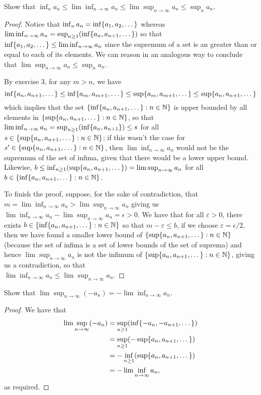 \begin{exercise}{22}
Show that $\inf_na_n\leq \lim\inf_{n\to\infty}a_n\leq \lim\sup_{n\to\infty}a_n\leq \sup_na_n$.
\end{exercise}
\begin{proof}
Notice that $\inf_na_n = \inf\{a_1,a_2,\dots\}$ whereas \\
$\lim\inf_{n\to\infty}a_n=\sup_{n\geq 1}(\inf\{a_n,a_{n+1},\dots\})$ so that
\\
$\inf\{a_1,a_2,\dots\}\leq\lim\inf_{n\to\infty}a_n$ since the supremum of a set is an greater than or equal to each of its elements. We can reason in an analogous way to conclude that $\lim\sup_{n\to\infty}a_n\leq \sup_na_n$. 

By exercise 3, for any $m>n$, we have 
\[
\inf\{a_n,a_{n+1},\dots\}
\leq\inf\{a_m,a_{m+1},\dots\} \leq\sup\{a_m,a_{m+1},\dots\} \leq\sup\{a_n,a_{n+1},\dots\}
\]
which implies that the set $\{\inf\{a_n,a_{n+1},\dots\}:n\in\mathbb{N}\}$ is upper bounded by all elements in $\{\sup\{a_n,a_{n+1},\dots\}:n\in\mathbb{N}\}$, so that $\lim\inf_{n\to\infty}a_n=\sup_{n\geq 1}(\inf\{a_n,a_{n+1}\})\leq s$ for all $s\in\{\sup\{a_n,a_{n+1},\dots\}:n\in\mathbb{N}\}$; if this wasn't the case for $s'\in\{\sup\{a_n,a_{n+1},\dots\}:n\in\mathbb{N}\}$, then $\lim\inf_{n\to\infty}a_n$ would not be the supremum of the set of infima, given that there would be a lower upper bound. Likewise, $b\leq\inf_{n\geq 1}(\sup\{a_n,a_{n+1},\dots\})=\lim\sup_{n\to\infty}a_n$ for all $b\in\{\inf\{a_n,a_{n+1},\dots\}:n\in\mathbb{N}\}$. 

To finish the proof, suppose, for the sake of contradiction, that
\\
$m=\lim\inf_{n\to\infty}a_n>\lim\sup_{n\to\infty}a_n$ giving us $\lim\inf_{n\to\infty}a_n-\lim\sup_{n\to\infty}a_n=\epsilon>0$. We have that for all $\varepsilon>0$, there exists $b\in\{\inf\{a_n,a_{n+1},\dots\}:n\in\mathbb{N}\}$ so that $m-\varepsilon\leq b$, if we choose $\varepsilon=\epsilon/2$, then we have found a smaller lower bound of $\{\sup\{a_n,a_{n+1},\dots\}:n\in\mathbb{N}\}$ (because the set of infima is a set of lower bounds of the set of suprema) and hence $\lim\sup_{n\to\infty}a_n$ is not the infimum of $\{\sup\{a_n,a_{n+1},\dots\}:n\in\mathbb{N}\}$, giving us a contradiction, so that
\\
$\lim\inf_{n\to\infty}a_n\leq \lim\sup_{n\to\infty}a_n$.
\end{proof}

\begin{exercise}{24}
Show that $\lim\sup_{n\to\infty}(-a_n)=-\lim\inf_{n\to\infty}a_n$.
\end{exercise}
\begin{proof}
We have that
\begin{align*}
    \lim\sup_{n\to\infty}(-a_n) &= \sup_{n\geq 1}(\inf\{-a_n,-a_{n+1},\dots\})\\
    &= \sup_{n\geq 1}(-\sup\{a_n,a_{n+1},\dots\})\\
    &= -\inf_{n\geq 1}(\sup\{a_n,a_{n+1},\dots\})\\
    &= -\lim\inf_{n\to\infty}a_n,
\end{align*}
as required.
\end{proof}

